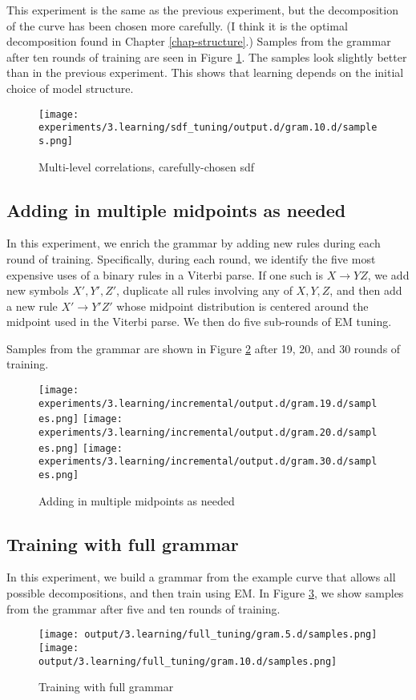 This experiment is the same as the previous experiment, but the
decomposition of the curve has been chosen more carefully. (I think it
is the optimal decomposition found in Chapter \ref{chap-structure}.)
Samples from the grammar after ten rounds of training are seen in
Figure \ref{fig-em-sdf}. The samples look slightly better than in the
previous experiment. This shows that learning depends on the initial
choice of model structure.

\begin{figure}
\texttt{[image: experiments/3.learning/sdf\_tuning/output.d/gram.10.d/samples.png]}
\caption{Multi-level correlations, carefully-chosen sdf}
\label{fig-em-sdf}
\end{figure}

\subsection{Adding in multiple midpoints as needed}

In this experiment, we enrich the grammar by adding new rules during
each round of training. Specifically, during each round, we identify
the five most expensive uses of a binary rules in a Viterbi parse. If
one such is $X\to YZ$, we add new symbols $X',Y',Z'$, duplicate all
rules involving any of $X,Y,Z$, and then add a new rule $X'\to Y'Z'$
whose midpoint distribution is centered around the midpoint used in
the Viterbi parse. We then do five sub-rounds of EM tuning.

Samples from the grammar are shown in Figure \ref{fig-em-incremental}
after 19, 20, and 30 rounds of training.

\begin{figure}
\texttt{[image: experiments/3.learning/incremental/output.d/gram.19.d/samples.png]}
\texttt{[image: experiments/3.learning/incremental/output.d/gram.20.d/samples.png]}
\texttt{[image: experiments/3.learning/incremental/output.d/gram.30.d/samples.png]}
\caption{Adding in multiple midpoints as needed}
\label{fig-em-incremental}
\end{figure}

\subsection{Training with full grammar}

In this experiment, we build a grammar from the example curve that
allows all possible decompositions, and then train using EM. In Figure
\ref{fig-em-full}, we show samples from the grammar after five and ten
rounds of training.

\begin{figure}
\texttt{[image: output/3.learning/full\_tuning/gram.5.d/samples.png]}
\texttt{[image: output/3.learning/full\_tuning/gram.10.d/samples.png]}
\caption{Training with full grammar}
\label{fig-em-full}
\end{figure}


